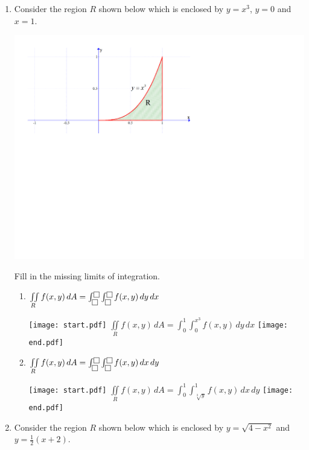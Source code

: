 \documentclass[12pt]{article}
\begin{document}
\begin{enumerate}

\item Consider the region $R$ shown below which is enclosed by $y=x^3$, $y=0$ and $x=1$.

\begin{center}
\includegraphics[scale=0.6]{int1.pdf}
\end{center}

Fill in the missing limits of integration.

\begin{enumerate}

\item $\iint \limits_{R} f(x,y) \,dA= \int_{\fbox{}}^{\fbox{}}\int_{\fbox{}}^{\fbox{}} f(x,y) \,dy \,dx$

\texttt{[image: start.pdf]}
{{$\iint \limits_{R} f(x,y) \,dA=\int_{0}^{1}\int_{0}^{x^3} f(x,y) \,dy \,dx $}}
\texttt{[image: end.pdf]}


\item $\iint \limits_{R} f(x,y) \,dA= \int_{\fbox{}}^{\fbox{}}\int_{\fbox{}}^{\fbox{}} f(x,y) \,dx \,dy$

\texttt{[image: start.pdf]}
{{$\iint \limits_{R} f(x,y) \,dA= \int_{0}^{1}\int_{\sqrt[3]{y}}^{1} f(x,y) \,dx \,dy$}}
\texttt{[image: end.pdf]}


\end{enumerate}

\item Consider the region $R$ shown below which is enclosed by $y=\sqrt{4-x^2}$ and $y=\frac{1}{2}(x+2)$.


\end{enumerate}
\end{document}
